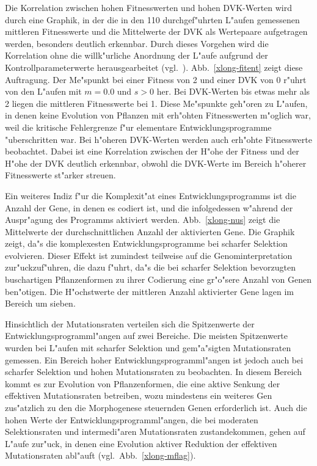 Die Korrelation zwischen hohen Fitnesswerten und hohen DVK-Werten wird durch eine Graphik, in der die in den
110 durchgef"uhrten L"aufen gemessenen mittleren Fitnesswerte und die Mittelwerte der DVK als Wertepaare
aufgetragen werden, besonders deutlich erkennbar.
Durch dieses Vorgehen wird die Korrelation ohne die willk"urliche Anordnung der
L"aufe aufgrund der Kontrollparameterwerte herausgearbeitet (vgl.\ \cite{Langton92}). Abb.\ \ref{xlong-fitent}
zeigt diese Auftragung. Der Me"spunkt bei einer Fitness von 2 und einer DVK von 0 r"uhrt von den L"aufen
mit $m=0.0$ und $s>0$ her. Bei DVK-Werten bis etwas mehr als 2 liegen die mittleren Fitnesswerte bei
1. Diese Me"spunkte geh"oren zu L"aufen, in denen keine Evolution von Pflanzen mit erh"ohten Fitnesswerten
m"oglich war, weil die kritische Fehlergrenze f"ur elementare Entwicklungsprogramme "uberschritten war.
Bei h"oheren DVK-Werten werden auch
erh"ohte Fitnesswerte beobachtet. Dabei ist eine Korrelation zwischen der H"ohe der Fitness und der H"ohe
der DVK deutlich erkennbar, obwohl die DVK-Werte im Bereich h"oherer Fitnesswerte st"arker streuen.

Ein weiteres Indiz f"ur die Komplexit"at eines Entwicklungsprogramms ist die Anzahl der Gene, in denen
es codiert ist, und die infolgedessen w"ahrend der Auspr"agung des Programms aktiviert werden.
Abb.\ \ref{xlong-nus} zeigt die Mittelwerte der durchschnittlichen Anzahl der aktivierten
Gene. Die Graphik zeigt, da"s  die komplexesten Entwicklungsprogramme bei scharfer Selektion evolvieren.
Dieser Effekt ist zumindest teilweise auf die Genominterpretation zur"uckzuf"uhren, die dazu f"uhrt,
da"s die bei scharfer Selektion bevorzugten buschartigen Pflanzenformen zu ihrer Codierung eine gr"o"sere
Anzahl von Genen ben"otigen. Die H"ochstwerte der mittleren Anzahl aktivierter Gene lagen im Bereich um sieben.

Hinsichtlich der Mutationsraten verteilen sich die Spitzenwerte der Entwicklungsprogramml"angen auf
zwei Bereiche. Die meisten Spitzenwerte wurden bei L"aufen mit scharfer Selektion und gem"a"sigten
Mutationsraten gemessen. Ein Bereich hoher Entwicklungsprogramml"angen ist jedoch auch bei scharfer
Selektion und hohen Mutationsraten zu beobachten. In diesem Bereich kommt es zur Evolution von
Pflanzenformen, die eine aktive Senkung der effektiven Mutationsraten betreiben, wozu mindestens ein
weiteres Gen zus"atzlich zu den die Morphogenese steuernden Genen erforderlich ist. Auch die hohen
Werte der Entwicklungsprogramml"angen, die bei moderaten Selektionsraten und intermedi"aren Mutationsraten
zustandekommen, gehen auf L"aufe zur"uck, in denen eine Evolution aktiver Reduktion der effektiven
Mutationsraten abl"auft (vgl.\ Abb.\ \ref{xlong-mflag}).

